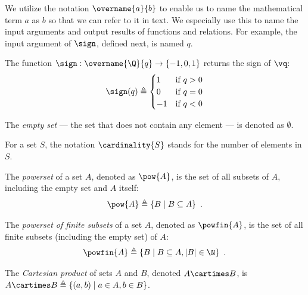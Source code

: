 We utilize the notation $\overname{a}{b}$ to enable us to name the mathematical term $a$ as $b$ so that
we can refer to it in text. We especially use this to name the input arguments and
output results of functions and relations. For example, the input argument of $\sign$,
defined next, is named $q$.

\hypertarget{def-sign}{}
\begin{definition}
  The function $\sign : \overname{\Q}{q} \rightarrow \{-1,0,1\}$ returns the sign of $\vq$:
\[
\sign(q) \triangleq \begin{cases}
  1 & \text{if }q > 0\\
  0 & \text{if }q = 0\\
  -1 & \text{if }q < 0
\end{cases}
\]
\end{definition}

\begin{definition}
  The \emph{empty set} --- the set that does not contain any element --- is denoted as $\emptyset$.
\end{definition}

\hypertarget{def-cardinality}{}
\begin{definition}
  For a set $S$, the notation $\cardinality{S}$ stands for the number of elements in $S$.
\end{definition}

\hypertarget{def-pow}{}
\begin{definition}[Powerset]
The \emph{powerset} of a set $A$, denoted as $\pow{A}$, is the set of all subsets of $A$, including the empty set and $A$ itself:
\[
    \pow{A} \triangleq \{ B \;|\; B \subseteq A\} \enspace.
\]
\end{definition}

\hypertarget{def-powfin}{}
\begin{definition}
  The \emph{powerset of finite subsets} of a set $A$, denoted as $\powfin{A}$, is the set of all finite subsets (including the empty set) of $A$:
  \[
     \powfin{A} \triangleq \{ B \;|\; B \subseteq A, |B| \in \N\} \enspace.
  \]
\end{definition}

\hypertarget{def-cartimes}{}
\begin{definition}
    The \emph{Cartesian product} of sets $A$ and $B$, denoted $A \cartimes B$,
    is $A \cartimes B \triangleq \{(a,b) \;|\; a \in A, b \in B\}$.
\end{definition}

